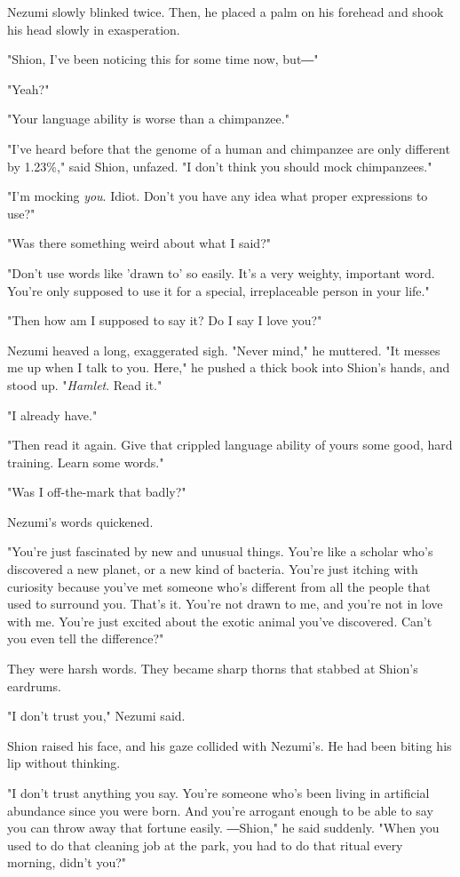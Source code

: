 Nezumi slowly blinked twice. Then, he placed a palm on his forehead and
shook his head slowly in exasperation.

"Shion, I've been noticing this for some time now, but―"

"Yeah?"

"Your language ability is worse than a chimpanzee."

"I've heard before that the genome of a human and chimpanzee are only
different by 1.23\%," said Shion, unfazed. "I don't think you should
mock chimpanzees."

"I'm mocking \emph{you}. Idiot. Don't you have any idea what proper expressions
to use?"

"Was there something weird about what I said?"

"Don't use words like 'drawn to' so easily. It's a very weighty,
important word. You're only supposed to use it for a special,
irreplaceable person in your life."

"Then how am I supposed to say it? Do I say I love you?"

Nezumi heaved a long, exaggerated sigh. "Never mind," he muttered. "It
messes me up when I talk to you. Here," he pushed a thick book into
Shion's hands, and stood up. "\emph{Hamlet}. Read it."

"I already have."

"Then read it again. Give that crippled language ability of yours some
good, hard training. Learn some words."

"Was I off-the-mark that badly?"

Nezumi's words quickened.

"You're just fascinated by new and unusual things. You're like a scholar
who's discovered a new planet, or a new kind of bacteria. You're just
itching with curiosity because you've met someone who's different from
all the people that used to surround you. That's it. You're not drawn to
me, and you're not in love with me. You're just excited about the exotic
animal you've discovered. Can't you even tell the difference?"

They were harsh words. They became sharp thorns that stabbed at Shion's
eardrums.

"I don't trust you," Nezumi said.

Shion raised his face, and his gaze collided with Nezumi's. He had been
biting his lip without thinking.

"I don't trust anything you say. You're someone who's been living in
artificial abundance since you were born. And you're arrogant enough to
be able to say you can throw away that fortune easily. ―Shion," he said
suddenly. "When you used to do that cleaning job at the park, you had to
do that ritual every morning, didn't you?"

